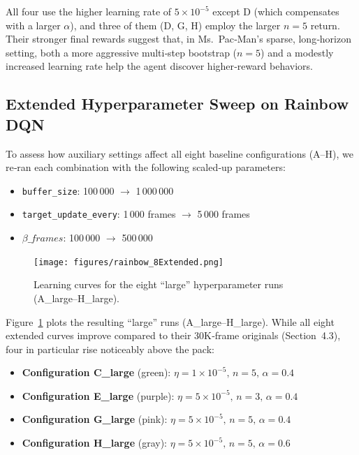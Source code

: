 \documentclass{article}
\begin{document}
All four use the higher learning rate of \(5\times10^{-5}\) except D (which compensates with a larger \(\alpha\)), and three of them (D, G, H) employ the larger \(n=5\) return. Their stronger final rewards suggest that, in Ms.\ Pac‑Man’s sparse, long‑horizon setting, both a more aggressive multi‑step bootstrap (\(n=5\)) and a modestly increased learning rate help the agent discover higher‑reward behaviors.

\subsection{Extended Hyperparameter Sweep on Rainbow DQN}

To assess how auxiliary settings affect all eight baseline configurations (A–H), we re‑ran each combination with the following scaled‑up parameters:
\begin{itemize}
  \item \texttt{buffer\_size}: 100\,000 \(\to\) 1\,000\,000  
  \item \texttt{target\_update\_every}: 1\,000 frames \(\to\) 5\,000 frames  
  \item \(\beta\_frames\): 100\,000 \(\to\) 500\,000  
\end{itemize}

\begin{figure}[ht]
  \centering
  \texttt{[image: figures/rainbow\_8Extended.png]}
  \caption{Learning curves for the eight “large” hyperparameter runs (A\_large–H\_large).}
  \label{fig:extended_sweep}
\end{figure}

Figure~\ref{fig:extended_sweep} plots the resulting “large” runs (A\_large–H\_large). While all eight extended curves improve compared to their 30K‑frame originals (Section 4.3), four in particular rise noticeably above the pack:
\begin{itemize}
  \item \textbf{Configuration C\_large} (green): \(\eta=1\times10^{-5},\,n=5,\,\alpha=0.4\)  
  \item \textbf{Configuration E\_large} (purple): \(\eta=5\times10^{-5},\,n=3,\,\alpha=0.4\)  
  \item \textbf{Configuration G\_large} (pink): \(\eta=5\times10^{-5},\,n=5,\,\alpha=0.4\)  
  \item \textbf{Configuration H\_large} (gray): \(\eta=5\times10^{-5},\,n=5,\,\alpha=0.6\)  
\end{itemize}
\end{document}
